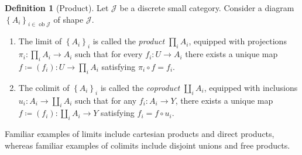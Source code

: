 \documentclass[10pt,letterpaper,cm]{nupset}
\theoremstyle{definition}
\newtheorem{definition}{Definition}[section]
\theoremstyle{theorem}
\theoremstyle{remark}
\newcommand{\1}{\mathbf{1}}
\renewcommand{\j}{\mathscr{J}}
\newcommand{\0}{\vec 0}
\DeclareMathOperator{\ob}{ob}
\begin{document}
\smallskip

\begin{definition}[Product]
Let $\j$ be a discrete small category. Consider a diagram  $\left\{A_i\right\}_{i\in \ob{\j}}$ of shape $\j$. 
\begin{enumerate}
\item The limit of $\left\{A_i\right\}_i$ is called the \textit{product} $\prod_i A_i$, equipped with projections $\pi_i : \prod_i A_i \to A_i$ such that for every $f_{i} : U \to A_i$ there exists a unique map $f\coloneqq \left(f_i\right) : U \to \prod_i A_i$ satisfying $\pi_i \circ f = f_i$. 
\item  The colimit of $\left\{A_i\right\}_i$ is called the \textit{coproduct} $\coprod_i A_i$, equipped with inclusions $u_i : A_i \to \coprod_i A_i$ such that for any $f_i : A_i \to Y$, there exists a unique map $f\coloneqq \left(f_i\right) : \coprod_i A_i \to Y$ satisfying $f_i = f \circ u_i$.
\end{enumerate}
\end{definition}

\smallskip

Familiar examples of limits include cartesian products and direct products, whereas familiar examples of colimits include disjoint unions and free products. 
\end{document}
